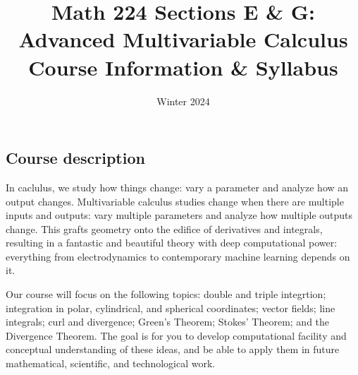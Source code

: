 \documentclass[11pt,twoside]{amsart}
\title{Math 224 Sections E \& G: Advanced Multivariable Calculus\\ Course Information \& Syllabus}
\author[Math 224:  Adv.~Multivariable Calculus]{Winter 2024}
\begin{document}
\maketitle

\thispagestyle{empty}

\vspace{-.5cm}

\begin{center}
\end{center}

\smallskip

\subsection*{Course description}
In caclulus, we study how things change: vary a parameter and analyze how an output changes. Multivariable calculus studies change when there are multiple inputs and outputs: vary multiple parameters and analyze how multiple outputs change. This grafts geometry onto the edifice of derivatives and integrals, resulting in a fantastic and beautiful theory with deep computational power: everything from electrodynamics to contemporary machine learning depends on it.

Our course will focus on the following topics: double and triple integrtion; integration in polar, cylindrical, and spherical coordinates; vector fields; line integrals; curl and divergence; Green’s Theorem; Stokes’ Theorem; and the Divergence Theorem. The goal is for you to develop computational facility and conceptual understanding of these ideas, and be able to apply them in future mathematical, scientific, and technological work.
\end{document}
